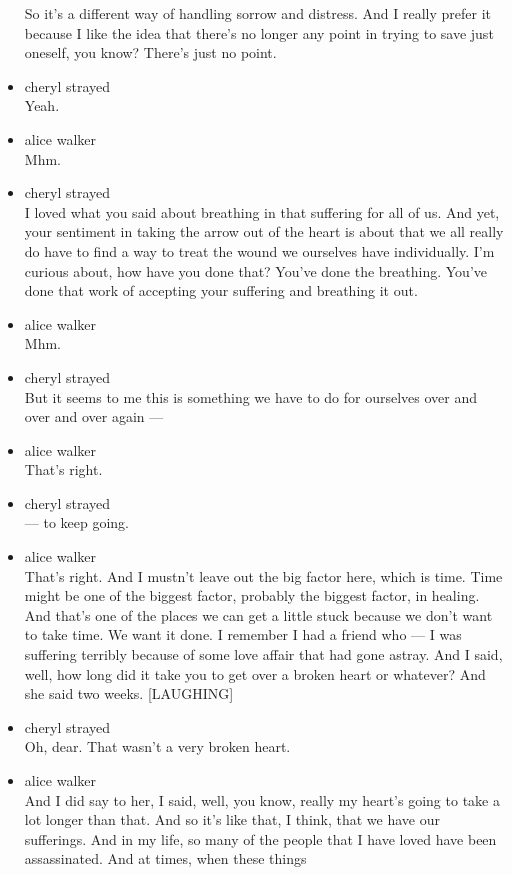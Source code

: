 \begin{itemize}
  So it's a different way of handling sorrow and distress. And I really
  prefer it because I like the idea that there's no longer any point in
  trying to save just oneself, you know? There's just no point.
\item
  cheryl strayed\\
  Yeah.
\item
  alice walker\\
  Mhm.
\item
  cheryl strayed\\
  I loved what you said about breathing in that suffering for all of us.
  And yet, your sentiment in taking the arrow out of the heart is about
  that we all really do have to find a way to treat the wound we
  ourselves have individually. I'm curious about, how have you done
  that? You've done the breathing. You've done that work of accepting
  your suffering and breathing it out.
\item
  alice walker\\
  Mhm.
\item
  cheryl strayed\\
  But it seems to me this is something we have to do for ourselves over
  and over and over again ---
\item
  alice walker\\
  That's right.
\item
  cheryl strayed\\
  --- to keep going.
\item
  alice walker\\
  That's right. And I mustn't leave out the big factor here, which is
  time. Time might be one of the biggest factor, probably the biggest
  factor, in healing. And that's one of the places we can get a little
  stuck because we don't want to take time. We want it done. I remember
  I had a friend who --- I was suffering terribly because of some love
  affair that had gone astray. And I said, well, how long did it take
  you to get over a broken heart or whatever? And she said two weeks.
  {[}LAUGHING{]}
\item
  cheryl strayed\\
  Oh, dear. That wasn't a very broken heart.
\item
  alice walker\\
  And I did say to her, I said, well, you know, really my heart's going
  to take a lot longer than that. And so it's like that, I think, that
  we have our sufferings. And in my life, so many of the people that I
  have loved have been assassinated. And at times, when these things

\end{itemize}
